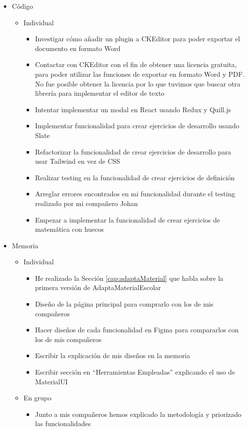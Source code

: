 \begin{itemize}
    \item Código
        \begin{itemize}
            \item Individual
                \begin{itemize}
                    \item Investigar cómo añadir un plugin a CKEditor para poder exportar el documento en formato Word
                    \item Contactar con CKEditor con el fin de obtener una licencia gratuita, para poder utilizar las funciones de exportar en formato Word y PDF. No fue posible obtener la licencia por lo que tuvimos que buscar otra librería para implementar el editor de texto
                    \item Intentar implementar un modal en React usando Redux y Quill.js
                    \item Implementar funcionalidad para crear ejercicios de desarrollo usando Slate
                    \item Refactorizar la funcionalidad de crear ejercicios de desarrollo para usar Tailwind en vez de CSS
                    \item Realizar testing en la funcionalidad de crear ejercicios de definición
                    \item Arreglar errores encontrados en mi funcionalidad durante el testing realizado por mi compañero Johan
                    \item Empezar a implementar la funcionalidad de crear ejercicios de matemática con huecos
                \end{itemize}
        \end{itemize}
    \item Memoria
    \begin{itemize}
        \item Individual
            \begin{itemize}
                \item He realizado la Sección \ref{cap:adaptaMaterial} que habla sobre la primera versión de AdaptaMaterialEscolar
                \item Diseño de la página principal para comprarlo con los de mis compañeros
                \item Hacer diseños de cada funcionalidad en Figma para compararlos con los de mis compañeros
                \item Escribir la explicación de mis diseños en la memoria
                \item Escribir sección en “Herramientas Empleadas” explicando el uso de MaterialUI
            \end{itemize}
        \item En grupo
            \begin{itemize}
                \item Junto a mis compañeros hemos explicado la metodología y priorizado las funcionalidades
            \end{itemize}
    \end{itemize}
\end{itemize}

